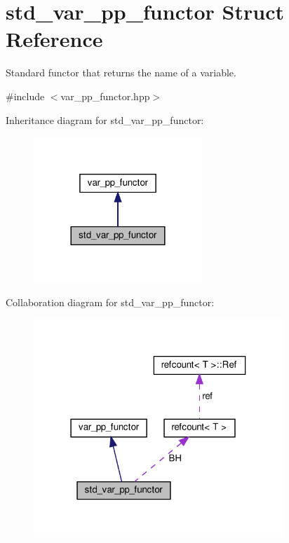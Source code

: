 \hypertarget{structstd__var__pp__functor}{}\section{std\+\_\+var\+\_\+pp\+\_\+functor Struct Reference}
\label{structstd__var__pp__functor}


Standard functor that returns the name of a variable.  




{\ttfamily \#include $<$var\+\_\+pp\+\_\+functor.\+hpp$>$}



Inheritance diagram for std\+\_\+var\+\_\+pp\+\_\+functor\+:
\nopagebreak
\begin{figure}[H]
\begin{center}
\leavevmode
\includegraphics[width=180pt]{df/d30/structstd__var__pp__functor__inherit__graph}
\end{center}
\end{figure}


Collaboration diagram for std\+\_\+var\+\_\+pp\+\_\+functor\+:
\nopagebreak
\begin{figure}[H]
\begin{center}
\leavevmode
\includegraphics[width=267pt]{da/da8/structstd__var__pp__functor__coll__graph}
\end{center}
\end{figure}
